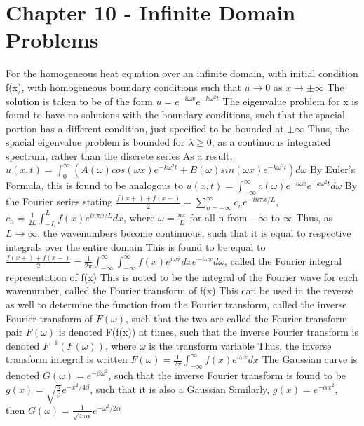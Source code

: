 \documentclass[11 pt, twoside]{article}
\newenvironment{outline*}
{
	\begin{outline}[enumerate]
	}
	{\end{outline}
}
\begin{document}
\section{Chapter 10 - Infinite Domain Problems}
\begin{outline*}
\1 For the homogeneous heat equation over an infinite domain, with initial condition f(x), with homogeneous boundary conditions such that $u \to 0$ as $x \to \pm \infty$
	\2 The solution is taken to be of the form $u = e^{-i\omega x}e^{-k\omega^2 t}$
	\2 The eigenvalue problem for x is found to have no solutions with the boundary conditions, such that the spacial portion has a different condition, just specified to be bounded at $\pm \infty$
		\3 Thus, the spacial eigenvalue problem is bounded for $\lambda \geq 0$, as a continuous integrated spectrum, rather than the discrete series
		\3 As a result, $u(x, t) = \int^{\infty}_0 (A(\omega)cos(\omega x)e^{-k\omega^2 t} + B(\omega)sin(\omega x)e^{-k\omega^2 t})d\omega$
	\2 By Euler's Formula, this is found to be analogous to $u(x, t) = \int^{\infty}_{-\infty} c(\omega)e^{-i\omega x}e^{-k\omega^2 t}d\omega$
\1 By the Fourier series stating $\frac{f(x+) + f(x-)}{2} = \sum_{n = -\infty}^{\infty} c_ne^{-in\pi x/L}$, $c_n = \frac{1}{2L}\int^L_{-L}f(x)e^{in\pi x/L}dx$, where $\omega = \frac{n\pi}{L}$ for all n from $-\infty$ to $\infty$
	\2 Thus, as $L \to \infty$, the wavenumbers become continuous, such that it is equal to respective integrals over the entire domain
		\3 This is found to be equal to $\frac{f(x+) + f(x-)}{2} = \frac{1}{2\pi}\int^{\infty}_{-\infty} \int^{\infty}_{-\infty} f(\bar{x})e^{i\omega \bar{x}}d\bar{x}e^{-i \omega x}d\omega$, called the Fourier integral representation of f(x)
		\3 This is noted to be the integral of the Fourier wave for each wavenumber, called the Fourier transform of f(x)
	\2 This can be used in the reverse as well to determine the function from the Fourier transform, called the inverse Fourier transform of $F(\omega)$, such that the two are called the Fourier transform pair
		\3 $F(\omega)$ is denoted F(f(x)) at times, such that the inverse Fourier transform is denoted $F^{-1}(F(\omega))$, where $\omega$ is the transform variable
		\3 Thus, the inverse transform integral is written $F(\omega) = \frac{1}{2\pi}\int^{\infty}_{-\infty} f(x)e^{i\omega x}dx$
	\2 The Gaussian curve is denoted $G(\omega) = e^{-\beta \omega^2}$, such that the inverse Fourier transform is found to be $g(x) = \sqrt{\frac{\pi}{\beta}}e^{-x^2/4\beta}$, such that it is also a Gaussian
		\3 Similarly, $g(x) = e^{-\alpha x^2}$, then $G(\omega) = \frac{1}{\sqrt{4\pi \alpha}}e^{-\omega^2/2\alpha}$

\end{outline*}
\end{document}
